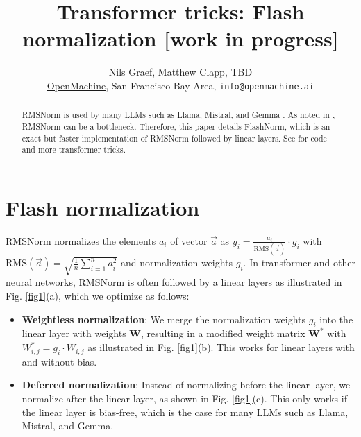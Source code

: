 \documentclass{article}
\title{Transformer tricks: Flash normalization [work in progress]}
\author{Nils Graef, Matthew Clapp, TBD \\
  \href{https://openmachine.ai}{OpenMachine}, San Francisco Bay Area, \texttt{info@openmachine.ai}}
\numberwithin{equation}{section} %
\newcommand{\mat}[1]{\mathbf{#1}}     %
\def\rms{\text{RMS}(\vec{a})}         %
\def\f1n{\frac{1}{n}}                 %
\def\sas{\sum_{i=1}^n a_i^2}          %
\def\W*{\mat{W}^\ast}                 %
\def\a{\vec{a}}                       %
\begin{document}
 \maketitle

\begin{abstract}
RMSNorm \citep{rms} is used by many LLMs such as Llama, Mistral, and Gemma \citep{LLaMA, mistral, gemma}. As noted in \citep{openelm}, RMSNorm can be a bottleneck. Therefore, this paper details FlashNorm, which is an exact but faster implementation of RMSNorm followed by linear layers. See \citep{tricks, remove, precompute} for code and more transformer tricks.
\end{abstract}

\section{Flash normalization}
RMSNorm \citep{rms} normalizes the elements  $a_i$ of vector $\a$ as $y_i = \frac{a_i}{\rms} \cdot g_i$ with $\rms = \sqrt{\f1n \sas}$ and normalization weights $g_i$. In transformer \citep{vanilla} and other neural networks, RMSNorm is often followed by a linear layers as illustrated in Fig. \ref{fig1}(a), which we optimize as follows:
\begin{itemize}[topsep=-1pt, itemsep=-1pt]
  \item \textbf{Weightless normalization}: We merge the normalization weights $g_i$ into the linear layer with weights $\mat{W}$, resulting in a modified weight matrix $\W*$ with $W_{i,j}^\ast = g_i \cdot W_{i,j}$ as illustrated in Fig. \ref{fig1}(b). This works for linear layers with and without bias.
  \item \textbf{Deferred normalization}: Instead of normalizing before the linear layer, we normalize after the linear layer, as shown in Fig. \ref{fig1}(c). This only works if the linear layer is bias-free, which is the case for many LLMs such as Llama, Mistral, and Gemma.
\end{itemize}
\end{document}
